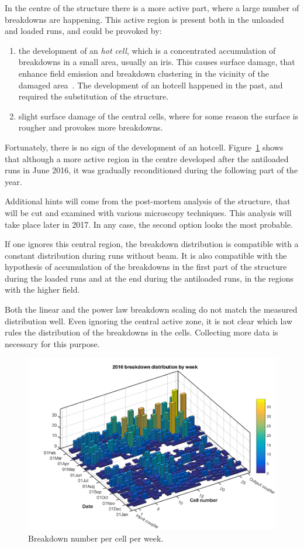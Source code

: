 In the centre of the structure there is a more active part, where a large number of breakdowns are happening. This active region is present both in the unloaded and loaded runs, and could be provoked by: 
\begin{enumerate}
\item the development of an \textit{hot cell}, which is a concentrated accumulation of breakdowns in a small area, usually an iris. This causes surface damage, that enhance field emission and breakdown clustering in the vicinity of the damaged area~\cite{Wang:2008ap}. The development of an hotcell happened in the past, and required the substitution of the structure.
\item slight surface damage of the central cells, where for some reason the surface is rougher and provokes more breakdowns. 
\end{enumerate}

Fortunately, there is no sign of the development of an hotcell. Figure~\ref{BD_3d} shows that although a more active region in the centre developed after the antiloaded runs in June 2016, it was gradually reconditioned during the following part of the year. 

Additional hints will come from the post-mortem analysis of the structure, that will be cut and examined with various microscopy techniques. This analysis will take place later in 2017. In any case, the second option looks the most probable. 

If one ignores this central region, the breakdown distribution is compatible with a constant distribution during runs without beam. It is also compatible with the hypothesis of accumulation of the breakdowns in  the first part of the structure during the loaded runs and at the end during the antiloaded runs, in the regions with the higher field.

Both the linear and the power law breakdown scaling do not match the measured distribution well. Even ignoring the central active zone, it is not clear which law rules the distribution of the breakdowns in the cells. Collecting more data is necessary for this purpose.

\begin{figure}[h]
\centering 
\includegraphics[scale=0.4]{pictures/week_distr_3D.png}
\caption{Breakdown number per cell per week. }
\label{BD_3d}
\end{figure}


